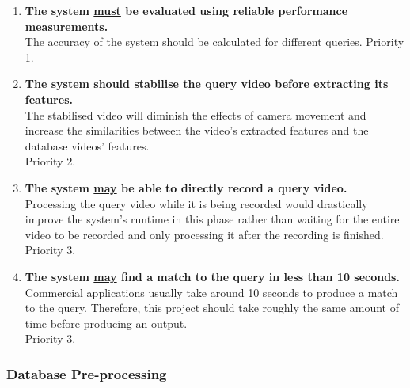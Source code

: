 \begin{enumerate}[label=F\arabic*,resume]
    \item \textbf{The system \underline{must} be evaluated using reliable performance measurements.}\\
    The accuracy of the system should be calculated for different queries.
    Priority 1.
    
    
    \item \textbf{The system \underline{should} stabilise the query video before extracting its features.}\\
    The stabilised video will diminish the effects of camera movement and increase the similarities between the video's extracted features and the database videos' features.\\
    Priority 2.
    
    \item \textbf{The system \underline{may} be able to directly record a query video.}\\
    Processing the query video while it is being recorded would drastically improve the system's runtime in this phase rather than waiting for the entire video to be recorded and only processing it after the recording is finished.\\
    Priority 3.
    
    \item \textbf{The system \underline{may} find a match to the query in less than 10 seconds.}\\
    Commercial applications usually take around 10 seconds to produce a match to the query. Therefore, this project should take roughly the same amount of time before producing an output.\\
    Priority 3.
    
\end{enumerate}

\subsubsection{Database Pre-processing}

